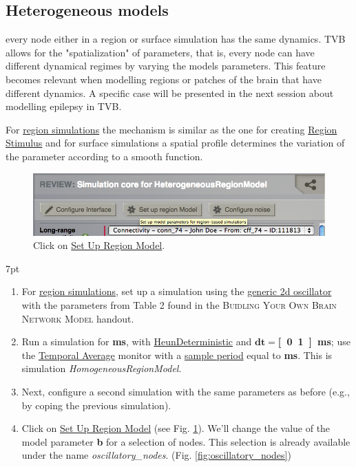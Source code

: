\documentclass{tufte-handout}
\newenvironment{simulation}{%
  \def\FrameCommand{%
    \hspace{1pt}%
    {\color{ForestGreen}\vrule width 2pt}%
    {\color{simulationshade}\vrule width 4pt}%
    \colorbox{simulationshade}%
  }%
  \MakeFramed{\advance\hsize-\width\FrameRestore}%
  \noindent\hspace{-4.55pt}%
  \begin{adjustwidth}{}{7pt}%
  \vspace{2pt}\vspace{2pt}%
}
{%
  \vspace{2pt}\end{adjustwidth}\endMakeFramed%
}
\begin{document}
\subsection{Heterogeneous models}\label{sec:spatialization}

 every node either in a region or surface
simulation has the same dynamics. TVB allows for the "spatialization" of
parameters, that is, every node can have different dynamical regimes by
varying the models parameters. This feature becomes relevant when modelling
regions or patches of the brain that have different dynamics. A specific case
will be presented in the next session about modelling epilepsy in TVB.

For \underline{region simulations} the mechanism is similar as the one for creating \underline{Region
Stimulus} and for surface simulations a spatial profile determines the
variation of the parameter according to a smooth function.

\begin{figure}[h]
  \includegraphics[width=\linewidth]{Handout_UI_HeterogenousModelAndStimulation_SetUpRegionModel.png}%
  \caption{Click on \underline{Set Up Region Model}.}%
  \label{fig:setup_regionmodel}%
\end{figure}

\begin{simulation}
\begin{enumerate}
\item For \underline{region simulations}, set up a simulation using the \underline{generic 2d oscillator} with the parameters from Table 2  found in the \textsc{Buidling Your Own Brain Network Model} handout. 
\item Run a simulation for \textbf{\unit[1000]{ms}}, with \underline{HeunDeterministic} and $\mathbf{dt=}$\textbf{\unit[0.1]{ms}}; use the \underline{Temporal Average} monitor with a \underline{sample period} equal to \textbf{\unit[1]{ms}}. This is simulation \textit{HomogeneousRegionModel}.
\item Next, configure a second simulation with the same parameters as before (e.g., by coping the previous simulation). 
\item Click on \underline{Set Up Region Model} (see Fig. \ref{fig:setup_regionmodel}). We'll change the value of the model parameter \textbf{b} for a selection of nodes. This selection is already available under the name \textit{oscillatory\_nodes}. (Fig. \ref{fig:oscillatory_nodes})
\end{enumerate}
\end{simulation}
\end{document}
